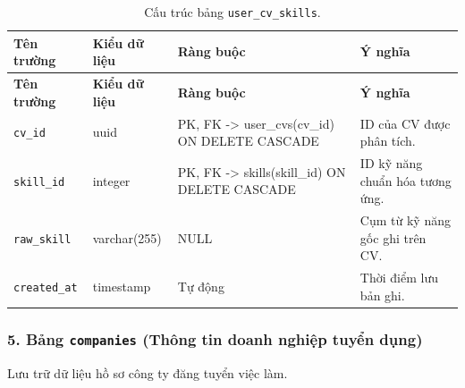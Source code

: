 \begin{footnotesize}\begin{longtable}{|L{3.5cm}|L{2.0cm}|L{3.0cm}|L{5.5cm}|}
\caption{Cấu trúc bảng \texttt{user\_\allowbreak cv\_\allowbreak skills}.}
\label{tab:user_cv_skills} \\
\hline
\textbf{Tên trường} & \textbf{Kiểu dữ liệu} & \textbf{Ràng buộc} & \textbf{Ý nghĩa} \\
\hline
\endfirsthead
\hline
\textbf{Tên trường} & \textbf{Kiểu dữ liệu} & \textbf{Ràng buộc} & \textbf{Ý nghĩa} \\
\hline
\endhead
\texttt{cv\_id} & uuid & PK, FK -> user\_cvs(cv\_id) ON DELETE CASCADE & ID của CV được phân tích. \\
\hline
\texttt{skill\_id} & integer & PK, FK -> skills(skill\_id) ON DELETE CASCADE & ID kỹ năng chuẩn hóa tương ứng. \\
\hline
\texttt{raw\_skill} & varchar(255) & NULL & Cụm từ kỹ năng gốc ghi trên CV. \\
\hline
\texttt{created\_at} & timestamp & Tự động & Thời điểm lưu bản ghi. \\
\hline
\end{longtable}
\end{footnotesize}

\subsubsection*{5. Bảng \texttt{companies} (Thông tin doanh nghiệp tuyển dụng)}

Lưu trữ dữ liệu hồ sơ công ty đăng tuyển việc làm.

